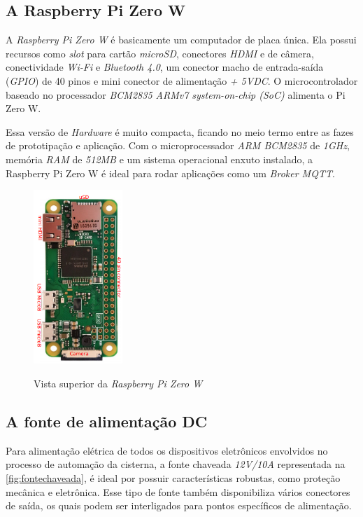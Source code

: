 \subsection{A Raspberry Pi Zero W}

A \textit{Raspberry Pi Zero W} é basicamente um computador de placa única. Ela possui recursos como \textit{slot} para cartão \textit{microSD}, conectores \textit{HDMI} e de câmera, conectividade \textit{Wi-Fi} e \textit{Bluetooth 4.0}, um conector macho de entrada-saída (\textit{GPIO}) de 40 pinos e mini conector de alimentação \textit{+ 5VDC}. O microcontrolador baseado no processador \textit{BCM2835 ARMv7 system-on-chip (SoC)} alimenta o Pi Zero W.

Essa versão de \textit{Hardware} é muito compacta, ficando no meio termo entre as fazes de prototipação e aplicação. Com o microprocessador \textit{ARM BCM2835} de \textit{1GHz}, memória \textit{RAM} de \textit{512MB} e um sistema operacional enxuto instalado, a Raspberry Pi Zero W é ideal para rodar aplicações como um \textit{Broker MQTT}.

\begin{figure}[H]
	\centering
	\caption{Vista superior da \textit{Raspberry Pi Zero W}}
	\includegraphics[width=0.3\textwidth, angle = 90]{figuras/rasp_zerow.png}
	\label{fig:rasppizerow}
\end{figure} 

\subsection{A fonte de alimentação DC}

Para alimentação elétrica de todos os dispositivos eletrônicos envolvidos no processo de automação da cisterna, a fonte chaveada \textit{12V/10A} representada na \autoref{fig:fontechaveada}, é ideal por possuir características robustas, como proteção mecânica e eletrônica. Esse tipo de fonte também disponibiliza vários conectores de saída, os quais podem ser interligados para pontos específicos de alimentação.

